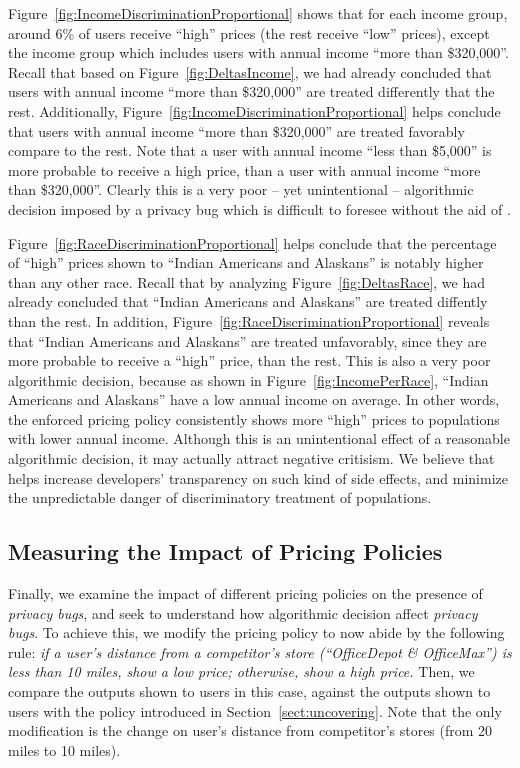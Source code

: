 Figure~\ref{fig:IncomeDiscriminationProportional} shows that for each income
group, around 6\% of users receive ``high'' prices (the rest receive ``low''
prices), except the income group which includes users with annual income
``more than \$320,000''. Recall that based on Figure~\ref{fig:DeltasIncome}, we
had already concluded that users with annual income ``more than \$320,000'' are
treated differently that the rest. Additionally,
Figure~\ref{fig:IncomeDiscriminationProportional} helps conclude that users with
annual income ``more than \$320,000'' are treated favorably compare to the rest.
Note that a user with annual income ``less than \$5,000'' is more probable to
receive a high price, than a user with annual income ``more than \$320,000''.
Clearly this is a very poor -- yet unintentional -- algorithmic decision imposed
by a privacy bug which is difficult to foresee without the aid of \sysname.


Figure~\ref{fig:RaceDiscriminationProportional} helps conclude that the
percentage of ``high'' prices shown to ``Indian Americans and Alaskans'' is
notably higher than any other race. Recall that by analyzing
Figure~\ref{fig:DeltasRace}, we had already concluded that
``Indian Americans and Alaskans'' are treated diffently than the rest.
In addition, Figure~\ref{fig:RaceDiscriminationProportional} reveals that
``Indian Americans and Alaskans'' are treated unfavorably, since they are
more probable to receive a ``high'' price, than the rest. This is also a very
poor algorithmic decision, because as shown in Figure~\ref{fig:IncomePerRace},
``Indian Americans and Alaskans'' have a low annual income on average. In
other words, the enforced pricing policy consistently shows more
``high'' prices to populations with lower annual income.
Although this is an unintentional effect of a reasonable algorithmic decision,
it may actually attract negative critisism. We believe that \sysname helps
increase developers' transparency on such kind of side effects, and minimize
the unpredictable danger of discriminatory treatment of populations.

\subsection{\normalsize Measuring the Impact of Pricing Policies}
Finally, we examine the impact of different pricing policies on the presence
of {\em privacy bugs}, and seek to understand how algorithmic decision
affect {\em privacy bugs}. To achieve this, we modify the pricing policy
to now abide by the following rule: {\it if a user's distance from a
competitor's store (``OfficeDepot \& OfficeMax'') is less than 10 miles,
show a low price; otherwise, show a high price.} Then, we compare the outputs
shown to users in this case, against the outputs shown to users with the policy
introduced in Section~\ref{sect:uncovering}. Note that the only modification 
is the change on user's distance from competitor's stores (from 20 miles
to 10 miles).

